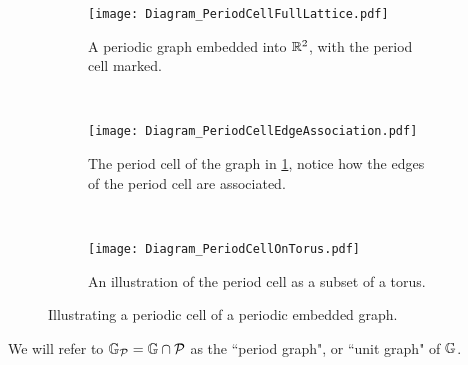 \begin{figure}[b!]
	\centering
	\begin{subfigure}[t]{0.45\textwidth}
		\centering
		\texttt{[image: Diagram\_PeriodCellFullLattice.pdf]}
		\caption{\label{fig:Diagram_PeriodCellFullLattice} A periodic graph embedded into $\mathbb{R}^2$, with the period cell marked.}
	\end{subfigure}
	~
	\begin{subfigure}[t]{0.45\textwidth}
		\centering
		\texttt{[image: Diagram\_PeriodCellEdgeAssociation.pdf]}
		\caption{\label{fig:Diagram_PeriodCellEdgeAssociation} The period cell of the graph in \ref{fig:Diagram_PeriodCellFullLattice}, notice how the edges of the period cell are associated.}
	\end{subfigure}
	\\
	\begin{subfigure}[b]{0.75\textwidth}
		\centering
		\texttt{[image: Diagram\_PeriodCellOnTorus.pdf]}
		\caption{\label{fig:Diagram_PeriodCellOnTorus} An illustration of the period cell as a subset of a torus.}
	\end{subfigure}
	\caption{\label{fig:PeriodCellIllustration} Illustrating a periodic cell of a periodic embedded graph.}
\end{figure} 
We will refer to $\mathbb{G}_{\mathcal{P}} = \mathbb{G} \cap \mathcal{P}$ as the ``period graph", or ``unit graph" of $\mathbb{G}$. \newline

